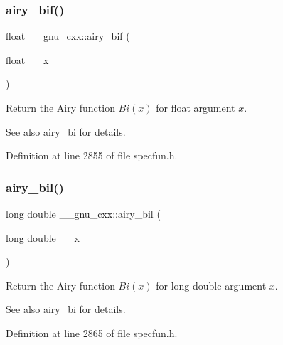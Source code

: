 \subsubsection{\texorpdfstring{airy\+\_\+bif()}{airy\_bif()}}
{\footnotesize\ttfamily float \+\_\+\+\_\+gnu\+\_\+cxx\+::airy\+\_\+bif (\begin{DoxyParamCaption}\item[{float}]{\+\_\+\+\_\+x }\end{DoxyParamCaption})\hspace{0.3cm}{\ttfamily [inline]}}

Return the Airy function $ Bi(x) $ for {\ttfamily float} argument $ x $.

\begin{DoxySeeAlso}{See also}
\hyperlink{group__gnu__math__spec__func_ga33c172cab7f8e9c99537444c7e30801a}{airy\+\_\+bi} for details. 
\end{DoxySeeAlso}


Definition at line 2855 of file specfun.\+h.

\mbox{\label{group__gnu__math__spec__func_ga59240b3f40177e5187f3f194f624f0f8}} 
\subsubsection{\texorpdfstring{airy\+\_\+bil()}{airy\_bil()}}
{\footnotesize\ttfamily long double \+\_\+\+\_\+gnu\+\_\+cxx\+::airy\+\_\+bil (\begin{DoxyParamCaption}\item[{long double}]{\+\_\+\+\_\+x }\end{DoxyParamCaption})\hspace{0.3cm}{\ttfamily [inline]}}

Return the Airy function $ Bi(x) $ for {\ttfamily long double} argument $ x $.

\begin{DoxySeeAlso}{See also}
\hyperlink{group__gnu__math__spec__func_ga33c172cab7f8e9c99537444c7e30801a}{airy\+\_\+bi} for details. 
\end{DoxySeeAlso}


Definition at line 2865 of file specfun.\+h.

